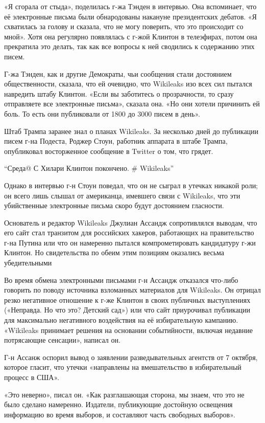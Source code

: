 «Я сгорала от стыда», поделилась г-жа Тэнден в интервью. Она вспоминает,
что её электронные письма были обнародованы накануне президентских
дебатов. «Я схватилась за голову и сказала, что не могу поверить, что
это происходит со мной». Хотя она регулярно появлялась с г-жой Клинтон в
телеэфирах, потом она прекратила это делать, так как все вопросы к ней
сводились к содержанию этих писем.

Г-жа Тэнден, как и другие Демократы, чьи сообщения стали достоянием
общественности, сказала, что ей очевидно, что Wikileaks изо всех сил
пытался навредить штабу Клинтон. «Если вы заботитесь о прозрачности, то
сразу отправляете все электронные письма», сказала она. «Но они хотели
причинить ей боль. То есть они публиковали от 1800 до 3000 писем в
день».

Штаб Трампа заранее знал о планах Wikileaks. За несколько дней до
публикации писем г-на Подеста, Роджер Стоун, работник аппарата в штабе
Трампа, опубликовал восторженное сообщение в Twitter о том, что грядет.

``Среда@ С Хилари Клинтон покончено. \# Wikileaks''

Однако в интервью г-н Стоун поведал, что он не сыграл в утечках никакой
роли; он всего лишь слышал от американца, имевшего связи с Wikileaks,
что эти убийственные электронные письма скоро будут достоянием
гласности.

Основатель и редактор Wikileaks Джулиан Ассандж сопротивлялся выводам,
что его сайт стал транзитом для российских хакеров, работающих на
правительство г-на Путина или что он намеренно пытался компрометировать
кандидатуру г-жи Клинтон. Но свидетельства по обеим этим позициям
оказались весьма убедительными

Во время обмена электронными письмами г-н Ассандж отказался что-либо
говорить по поводу источника взломанных материалов для Wikileaks. Он
отрицал резко негативное отношение к г-же Клинтон в своих публичных
выступлениях («Неправда. Но что это? Детский сад») или что сайт
приурочивал публикации для максимально негативного воздействия на её
избирательную кампанию. «Wikileaks принимает решения на основании
событийности, включая недавние потрясающие сенсации», написал он.

Г-н Ассанж оспорил вывод о заявлении разведывательных агентств от 7
октября, которое гласит, что утечки «направлены на вмешательство в
избирательный процесс в США».

«Это неверно», писал он. «Как разглашающая сторона, мы знаем, что это не
было сделано намеренно. Издатели, публикующие достойную освещения
информацию во время выборов, и составляют часть свободных выборов».

